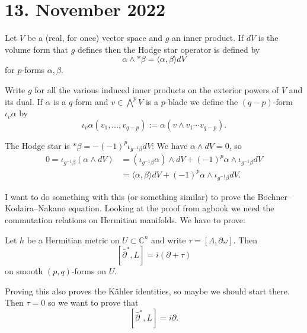 \documentclass[11pt]{amsart}
\theoremstyle{definition}
\newcommand{\kk}[1]{\mathbb{#1}}
\begin{document}
\section{13. November 2022}

Let $V$ be a (real, for once) vector space and $g$ an inner product.
If $dV$ is the volume form that $g$ defines then the Hodge star operator is
defined by
$$
\alpha \wedge * \beta = \langle \alpha, \beta \rangle dV
$$
for $p$-forms $\alpha,\beta$.

Write $g$ for all the various induced inner products on the exterior powers of
$V$ and its dual.
If $\alpha$ is a $q$-form and $v \in \bigwedge^p V$ is a $p$-blade we define
the $(q-p)$-form $\iota_v\alpha$ by
$$
\iota_v \alpha (v_1, \ldots, v_{q-p})
:= \alpha(v \wedge v_1 \cdots v_{q-p}).
$$

The Hodge star is $* \beta = -(-1)^p \iota_{g^{-1}\beta} dV$:
We have $\alpha \wedge dV = 0$, so
\begin{align*}
0 = \iota_{g^{-1}\beta} (\alpha \wedge dV)
&= (\iota_{g^{-1}\beta} \alpha) \wedge dV
+ (-1)^p \alpha \wedge \iota_{g^{-1}\beta} dV
\\
&= \langle \alpha, \beta \rangle dV
+ (-1)^p \alpha \wedge \iota_{g^{-1}\beta} dV.
\end{align*}

I want to do something with this (or something similar) to prove the
Bochner--Kodaira--Nakano equation.
Looking at the proof from agbook we need the commutation relations on Hermitian
manifolds.
We have to prove:

Let $h$ be a Hermitian metric on $U \subset \kk C^n$ and write
$\tau = [\Lambda, \partial \omega]$.
Then
$$
[\bar\partial^*, L] = i(\partial + \tau)
$$
on smooth $(p,q)$-forms on $U$.

Proving this also proves the K\"ahler identities, so maybe we should start there.
Then $\tau = 0$ so we want to prove that
$$
[\bar\partial^*, L] = i\partial.
$$
\end{document}
